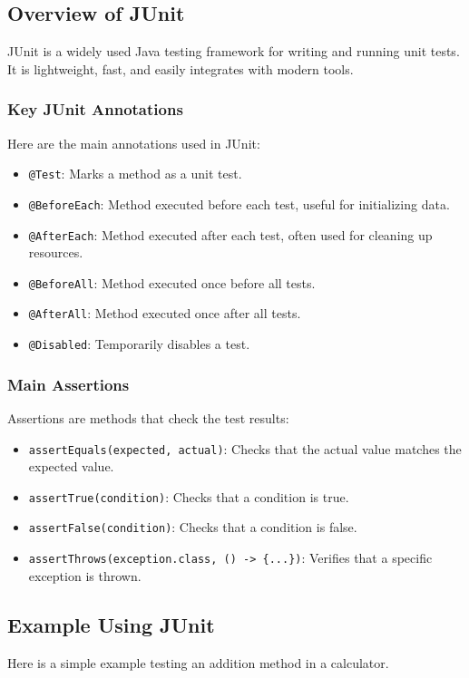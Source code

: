 \documentclass[12pt,a4paper]{article}
\begin{document}
\subsection{Overview of JUnit}
JUnit is a widely used Java testing framework for writing and running unit tests. It is lightweight, fast, and easily integrates with modern tools.

\subsubsection{Key JUnit Annotations}
Here are the main annotations used in JUnit:
\begin{itemize}
    \item \texttt{@Test}: Marks a method as a unit test.
    \item \texttt{@BeforeEach}: Method executed before each test, useful for initializing data.
    \item \texttt{@AfterEach}: Method executed after each test, often used for cleaning up resources.
    \item \texttt{@BeforeAll}: Method executed once before all tests.
    \item \texttt{@AfterAll}: Method executed once after all tests.
    \item \texttt{@Disabled}: Temporarily disables a test.
\end{itemize}

\subsubsection{Main Assertions}
Assertions are methods that check the test results:
\begin{itemize}
    \item \texttt{assertEquals(expected, actual)}: Checks that the actual value matches the expected value.
    \item \texttt{assertTrue(condition)}: Checks that a condition is true.
    \item \texttt{assertFalse(condition)}: Checks that a condition is false.
    \item \texttt{assertThrows(exception.class, () -> \{...\})}: Verifies that a specific exception is thrown.
\end{itemize}

\subsection{Example Using JUnit}
Here is a simple example testing an addition method in a calculator.
\end{document}
